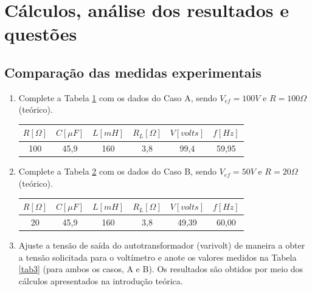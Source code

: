 \documentclass[a4paper,12pt,oneside,openany,table,xcdraw]{article}
\begin{document}
\section{Cálculos, análise dos resultados e questões} %

\subsection{Comparação das medidas experimentais}
\begin{enumerate}[1 - ]
\item Complete a Tabela \ref{tab1} com os dados do Caso A, sendo $V_{ef}=100V$ e $R=100\Omega$ (teórico).

\begin{table}[h]
\centering
\def\arraystretch{1.35}
\captionsetup{font=scriptsize}
 \label{tab1}
\begin{tabular}{|c|c|c|c|c|c|}
\hline
$R [\Omega]$ & $C [\mu F]$ & $L [mH]$ & $R_L [\Omega]$ & $V [volts]$ & $f [Hz]$ \\ \hline
       100      &    45,9     &    160      &         3,8       &      99,4       &     59,95     \\ \hline
\end{tabular}
\end{table}

\item Complete a Tabela \ref{tab2} com os dados do Caso B, sendo $V_{ef}=50V$ e $R=20\Omega$ (teórico). \\

\begin{table}[h]
\centering
\def\arraystretch{1.35}
\captionsetup{font=scriptsize}
 \label{tab2}
\begin{tabular}{|c|c|c|c|c|c|}
\hline
$R [\Omega]$ & $C [\mu F]$ & $L [mH]$ & $R_L [\Omega]$ & $V [volts]$ & $f [Hz]$ \\ \hline
       20      &    45,9     &    160      &         3,8       &       49,39      &     60,00     \\ \hline
\end{tabular}
\end{table}

\item Ajuste a tensão de saída do autotransformador (varivolt) de maneira a obter a tensão solicitada para o voltímetro e anote os valores medidos na Tabela \ref{tab3} (para ambos os casos, A e B). Os resultados são obtidos por meio dos cálculos apresentados na introdução teórica. \\
\begin{table}[H]
\centering
\def\arraystretch{1.35}
\captionsetup{font=scriptsize}
 \label{tab3}


\end{table}
\end{enumerate}
\end{document}
